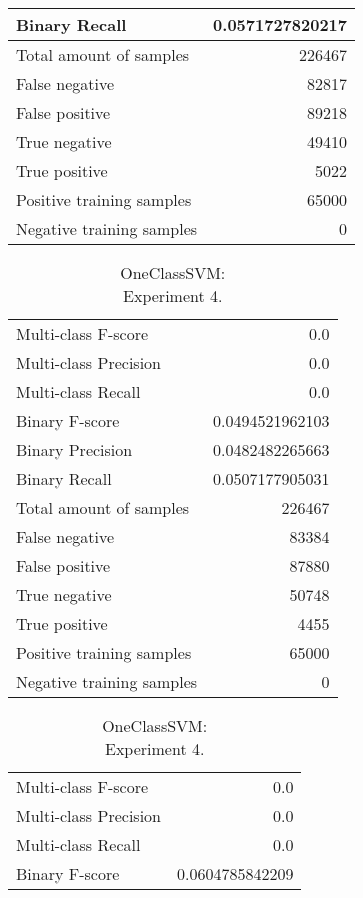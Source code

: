 \begin{table}[H]
\begin{minipage}{0.5\textwidth}
\begin{tabular}{l r}
Binary Recall & 0.0571727820217 \\
\midrule
Total amount of samples & 226467 \\
False negative & 82817 \\
False positive & 89218 \\
True negative & 49410 \\
True positive & 5022 \\
\midrule
Positive training samples & 65000 \\
Negative training samples & 0 \\
\bottomrule
\end{tabular}
\end{minipage}
\end{table}
\begin{table}[H]
\begin{minipage}{0.5\textwidth}
\caption{OneClassSVM: \\Experiment 3.}
\centering
\begin{tabular}{l r}
\toprule
Multi-class F-score & 0.0 \\
Multi-class Precision & 0.0 \\
Multi-class Recall & 0.0 \\
\midrule
Binary F-score & 0.0494521962103 \\
Binary Precision & 0.0482482265663 \\
Binary Recall & 0.0507177905031 \\
\midrule
Total amount of samples & 226467 \\
False negative & 83384 \\
False positive & 87880 \\
True negative & 50748 \\
True positive & 4455 \\
\midrule
Positive training samples & 65000 \\
Negative training samples & 0 \\
\bottomrule
\end{tabular}
\end{minipage}
\hfillx
\begin{minipage}{0.5\textwidth}
\caption{OneClassSVM: \\Experiment 4.}
\centering
\begin{tabular}{l r}
\toprule
Multi-class F-score & 0.0 \\
Multi-class Precision & 0.0 \\
Multi-class Recall & 0.0 \\
\midrule
Binary F-score & 0.0604785842209 \\

\end{tabular}
\end{minipage}
\end{table}
